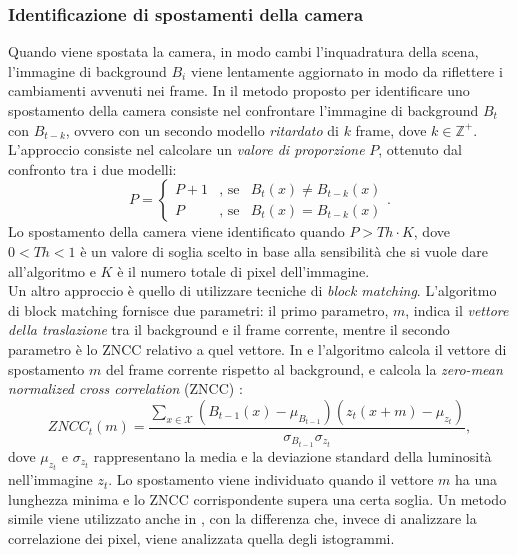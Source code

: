\subsubsection{Identificazione di spostamenti della camera}
Quando viene spostata la camera, in modo cambi l'inquadratura della scena, l'immagine di background $B_i$ viene lentamente aggiornato in modo da riflettere i cambiamenti avvenuti nei frame. 
In \cite{saglam2009real} il metodo proposto per identificare uno spostamento della camera consiste nel confrontare l'immagine di background $B_t$ con $B_{t-k}$, ovvero con un secondo modello \textit{ritardato} di $k$ frame, dove $k \in \mathbb{Z}^+$.
L'approccio consiste nel calcolare un \textit{valore di proporzione} $P$, ottenuto dal confronto tra i due modelli:
\[
\label{eq:displEqSaglam}
P=\left\{ \begin{array} {lcl}
P+1 & \mbox{, se} & B_t(x) \neq B_{t-k}(x) \\
P & \mbox{, se} & B_t(x) = B_{t-k}(x) \end{array} \right. .
\]
Lo spostamento della camera viene identificato quando $P > Th \cdot K$, dove $0<Th<1$ \`e un valore di soglia scelto in base alla sensibilit\`a che si vuole dare all'algoritmo e $K$ \`e il numero totale di pixel dell'immagine.\\
Un altro approccio \`e quello di utilizzare tecniche di \textit{block matching}.
L'algoritmo di block matching fornisce due parametri:
il primo parametro, $m$, indica il \textit{vettore della traslazione} tra il background e il frame corrente, mentre il secondo parametro \`e lo ZNCC relativo a quel vettore.
In \cite{gil2007automatic} e \cite{harasse2004automated} l'algoritmo calcola il vettore di spostamento $m$ del frame corrente rispetto al background, e calcola la \textit{zero-mean normalized cross correlation} (ZNCC) \cite{roma2002comparative}:
\[
ZNCC_t(m) = \frac{\sum_{x \in \mathcal{X}}(B_{t-1}(x)- \mu_{B_{t-1}})(z_t(x+m)-\mu_{z_t})}{\sigma_{B_{t-1}} \sigma_{z_t}},
\]
dove $\mu_{z_t}$ e $\sigma_{z_t}$ rappresentano la media e la deviazione standard della luminosit\`a nell'immagine $z_t$.
Lo spostamento viene individuato quando il vettore $m$ ha una lunghezza minima e lo ZNCC corrispondente supera una certa soglia.
Un metodo simile viene utilizzato anche in \cite{kryjak2012fpga}, con la differenza che, invece di analizzare la correlazione dei pixel, viene analizzata quella degli istogrammi. 
